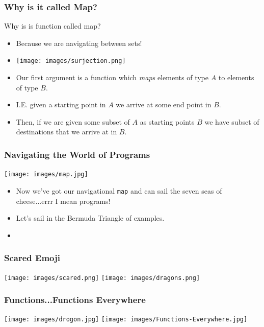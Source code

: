 \documentclass{beamer}
\begin{document}
\begin{frame}
  \frametitle{Why is it called Map?}
  Why is is function called map?
  \begin{itemize}
  \item<2-> Because we are navigating between sets!
  \item<3-> \texttt{[image: images/surjection.png]}
  \item<4-> Our first argument is a function which \emph{maps} elements
    of type $A$ to elements of type $B$.
  \item<5-> I.E. given a starting point in $A$ we arrive at some end point in $B$.
  \item<6-> Then, if we are given some subset of $A$ as starting points $B$ we
    have  subset of destinations that we arrive at in $B$. 
  \end{itemize}
\end{frame}


\begin{frame}
  \frametitle{Navigating the World of Programs}
  \begin{center}
    \texttt{[image: images/map.jpg]}
  \end{center}
  \begin{itemize}
  \item<2-> Now we've got our navigational \texttt{map} and can sail the seven seas
    of cheese...errr I mean programs!
  \item<3-> Let's sail in the Bermuda Triangle of examples.    
  \item<4-> \scary
  \end{itemize}
\end{frame}

\begin{frame}
  \frametitle{Scared Emoji}
  \begin{center}
    \texttt{[image: images/scared.png]}
    \texttt{[image: images/dragons.png]}
  \end{center}
\end{frame}

\begin{frame}
  \frametitle{Functions...Functions Everywhere}
  \begin{center}
    \texttt{[image: images/drogon.jpg]}
    \texttt{[image: images/Functions-Everywhere.jpg]}
  \end{center}
\end{frame}
\end{document}
